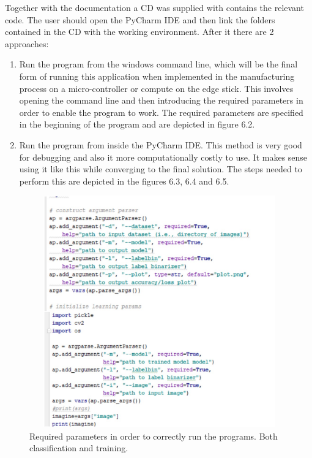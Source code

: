 \documentclass[12pt,a4paper,twoside]{report}
\begin{document}
Together with the documentation a CD was supplied with contains the relevant code. The user should open the PyCharm IDE and then link the folders contained in the CD with the working environment. After it there are 2 approaches:
\begin{enumerate}
    \item Run the program from the windows command line, which will be the final form of running this application when implemented in the manufacturing process on a micro-controller or compute on the edge stick. This involves opening the command line and then introducing the required parameters in order to enable the program to work. The required parameters are specified in the beginning of the program and are depicted in figure 6.2.
    \item Run the program from inside the PyCharm IDE. This method is very good for debugging and also it more computationally costly to use. It makes sense using it like this while converging to the final solution. The steps needed to perform this are depicted in the figures 6.3, 6.4 and 6.5.
\end{enumerate}

\begin{figure}[h!]
	\centering
	\includegraphics[width=15cm, height=10cm]{img/data/imagerun1.jpg}
	\caption[]
	{Required parameters in order to correctly run the programs. Both classification and training.}
	\label{fig:imagerun1}
\end{figure}
\end{document}
